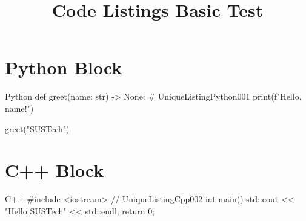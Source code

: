\documentclass[code=listings]{SUSTechHomework}
\title{Code Listings Basic Test}
\begin{document}
\maketitle

\section{Python Block}

\begin{sustechcode}{Python}
def greet(name: str) -> None:
    # UniqueListingPython001
    print(f"Hello, {name}!")

greet("SUSTech")
\end{sustechcode}

\section{C++ Block}

\begin{sustechcode}{C++}
#include <iostream>
// UniqueListingCpp002
int main() {
    std::cout << "Hello SUSTech" << std::endl;
    return 0;
}
\end{sustechcode}
\end{document}
